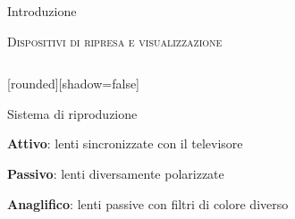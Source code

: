 \documentclass{beamer}
\begin{document}
\begin{section}{Introduzione}
\begin{frame}[t]{\textsc{Dispositivi di ripresa e visualizzazione}}
\begin{columns}
\begin{column}{5cm}
\vspace{-2.8em}
\begin{center}
[rounded][shadow=false]
\begin{block}{Sistema di riproduzione}
		\begin{itemize}
			\item  \small{\textbf{Attivo}: lenti sincronizzate con il televisore
			\item \textbf{Passivo}: lenti diversamente polarizzate
			\item \textbf{Anaglifico}: lenti passive con filtri di colore diverso}
		\end{itemize}	
	\end{block}
\end{center}
\end{column}
\end{columns}
\end{frame}




\end{section}
\end{document}
